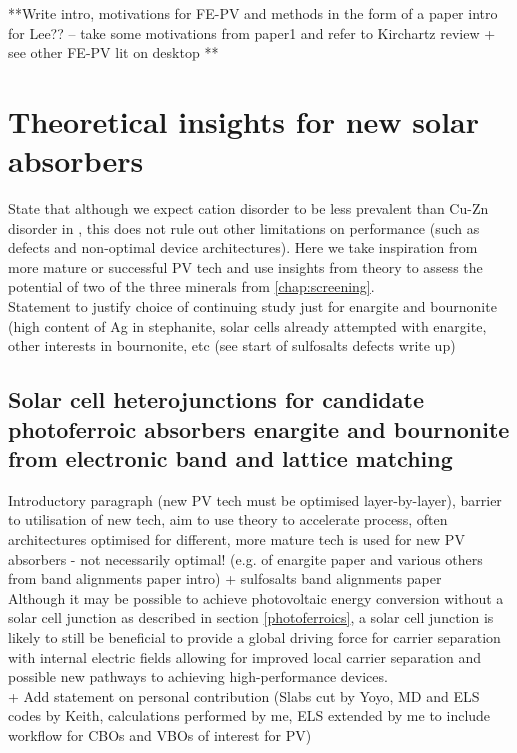 \documentclass[11pt, twoside]{report}
\begin{document}
**Write intro, motivations for FE-PV and methods in the form of a paper intro for Lee?? – take some motivations from paper1 and refer to Kirchartz review + see other FE-PV lit on desktop **


\chapter{Theoretical insights for new solar absorbers}\label{chap:insights}
State that although we expect cation disorder to be less prevalent than Cu-Zn disorder in {\CZTS}, this does not rule out other limitations on performance (such as defects and non-optimal device architectures). Here we take inspiration from more mature or successful PV tech and use insights from theory to assess the potential of two of the three minerals from \autoref{chap:screening}.\\

Statement to justify choice of continuing study just for enargite and bournonite (high content of Ag in stephanite, solar cells already attempted with enargite, other interests in bournonite, etc (see start of sulfosalts defects write up)

\section{Solar cell heterojunctions for candidate photoferroic absorbers enargite
and bournonite from electronic band and lattice matching}\label{sulfosalt_band_alignment}
Introductory paragraph (new PV tech must be optimised layer-by-layer), barrier to utilisation of new tech, aim to use theory to accelerate process, often architectures optimised for different, more mature tech is used for new PV absorbers - not necessarily optimal! (e.g. of enargite paper and various others from band alignments paper intro) + sulfosalts band alignments paper\\

Although it may be possible to achieve photovoltaic energy conversion without a solar cell junction as described in section \ref{photoferroics}, a solar cell junction is likely to still be beneficial to provide a global driving force for carrier separation with internal electric fields allowing for improved local carrier separation and possible new pathways to achieving high-performance devices.\\

+ Add statement on personal contribution (Slabs cut by Yoyo, MD and ELS codes by Keith, calculations performed by me, ELS extended by me to include workflow for CBOs and VBOs of interest for PV)
\end{document}
